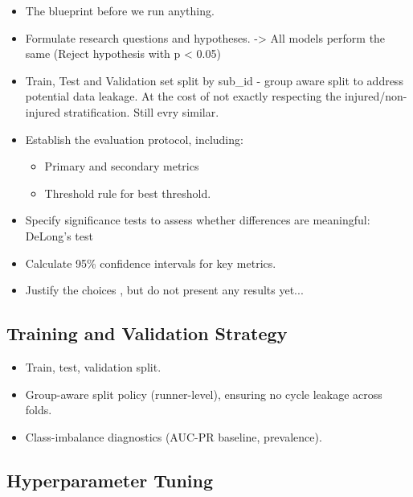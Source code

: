 \begin{itemize}
    \item The blueprint before we run anything.
    \item Formulate research questions and hypotheses. -> All models perform the same (Reject hypothesis with p < 0.05)
    \item Train, Test and Validation set split by sub\_id - group aware split to address potential data leakage. At the cost of not exactly respecting the injured/non-injured stratification. Still evry similar.
    \item Establish the evaluation protocol, including:
    \begin{itemize}
        \item Primary and secondary metrics
        \item Threshold rule for best threshold.
    \end{itemize}
    \item Specify significance tests to assess whether differences are meaningful: DeLong's test
    \item Calculate 95\% confidence intervals for key metrics.
    \item Justify the choices , but do not present any results yet...
\end{itemize}


\subsection{Training and Validation Strategy}\label{subsec:method-training-validation-strategy}

\begin{itemize}
    \item Train, test, validation split.
    \item Group-aware split policy (runner-level), ensuring no cycle leakage across folds.
    \item Class-imbalance diagnostics (AUC-PR baseline, prevalence).
\end{itemize}

\subsection{Hyperparameter Tuning}\label{subsec:method-hyperparameter-tuning}

